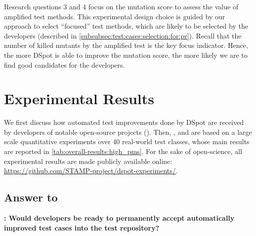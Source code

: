\documentclass[table,xcdraw,smallextended]{svjour3}
\newcommand{\dspot}{DSpot\xspace}
\begin{document}
Research questions 3 and 4 focus on the mutation score to assess the value of amplified test methods. This experimental design choice is guided by our approach to select ``focused'' test methods, which are likely to be selected by the developers (described in \autoref{subsubsec:test:cases:selection:for:pr}). 
Recall that the number of killed mutants by the amplified test is the key focus indicator. Hence, the more \dspot is able to improve the mutation score, the more likely we are to find good candidates for the developers.%


\section{Experimental Results}
\label{sec:results}

We first discuss how automated test improvements done by \dspot are received by developers of notable open-source projects (\rqpullrequest{}).
Then, \rqcandidates{}, \rqeffectiveness{} and \rqAmplVersusIAmpl{} are based on a large scale quantitative experiments over 40 real-world test classes, whose main results are reported in \autoref{tab:overall-results:high_pms}. %
For the sake of open-science, all experimental results are made publicly available online:\\
\url{https://github.com/STAMP-project/dspot-experiments/}.




\subsection{Answer to \rqpullrequest}
\label{subsubsec:answer-rqpullrequest}

\textbf{\rqpullrequest: Would developers be ready to permanently accept automatically improved test cases into the test repository?}
\end{document}
